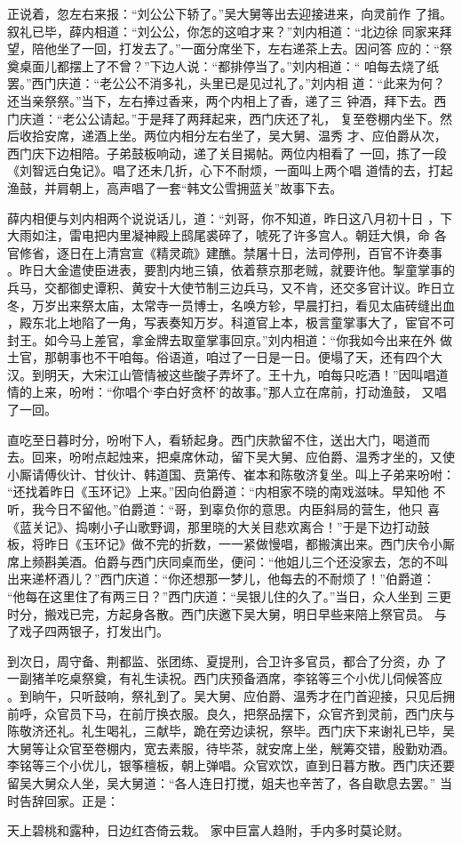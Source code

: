 正说着，忽左右来报：“刘公公下轿了。”吴大舅等出去迎接进来，向灵前作
了揖。叙礼已毕，薛内相道：“刘公公，你怎的这咱才来？”刘内相道：“北边徐
同家来拜望，陪他坐了一回，打发去了。”一面分席坐下，左右递茶上去。因问答
应的：“祭奠桌面儿都摆上了不曾？”下边人说：“都排停当了。”刘内相道：“
咱每去烧了纸罢。”西门庆道：“老公公不消多礼，头里已是见过礼了。”刘内相
道：“此来为何？还当亲祭祭。”当下，左右捧过香来，两个内相上了香，递了三
钟酒，拜下去。西门庆道：“老公公请起。”于是拜了两拜起来，西门庆还了礼，
复至卷棚内坐下。然后收拾安席，递酒上坐。两位内相分左右坐了，吴大舅、温秀
才、应伯爵从次，西门庆下边相陪。子弟鼓板响动，递了关目揭帖。两位内相看了
一回，拣了一段《刘智远白兔记》。唱了还未几折，心下不耐烦，一面叫上两个唱
道情的去，打起渔鼓，并肩朝上，高声唱了一套“韩文公雪拥蓝关”故事下去。

薛内相便与刘内相两个说说话儿，道：“刘哥，你不知道，昨日这八月初十日
，下大雨如注，雷电把内里凝神殿上鸱尾裘碎了，唬死了许多宫人。朝廷大惧，命
各官修省，逐日在上清宫宣《精灵疏》建醮。禁屠十日，法司停刑，百官不许奏事
。昨日大金遣使臣进表，要割内地三镇，依着蔡京那老贼，就要许他。掣童掌事的
兵马，交都御史谭积、黄安十大使节制三边兵马，又不肯，还交多官计议。昨日立
冬，万岁出来祭太庙，太常寺一员博士，名唤方轸，早晨打扫，看见太庙砖缝出血
，殿东北上地陷了一角，写表奏知万岁。科道官上本，极言童掌事大了，宦官不可
封王。如今马上差官，拿金牌去取童掌事回京。”刘内相道：“你我如今出来在外
做土官，那朝事也不干咱每。俗语道，咱过了一日是一日。便塌了天，还有四个大
汉。到明天，大宋江山管情被这些酸子弄坏了。王十九，咱每只吃酒！”因叫唱道
情的上来，吩咐：“你唱个‘李白好贪杯’的故事。”那人立在席前，打动渔鼓，
又唱了一回。

直吃至日暮时分，吩咐下人，看轿起身。西门庆款留不住，送出大门，喝道而
去。回来，吩咐点起烛来，把桌席休动，留下吴大舅、应伯爵、温秀才坐的，又使
小厮请傅伙计、甘伙计、韩道国、贲第传、崔本和陈敬济复坐。叫上子弟来吩咐：
“还找着昨日《玉环记》上来。”因向伯爵道：“内相家不晓的南戏滋味。早知他
不听，我今日不留他。”伯爵道：“哥，到辜负你的意思。内臣斜局的营生，他只
喜《蓝关记》、捣喇小子山歌野调，那里晓的大关目悲欢离合！”于是下边打动鼓
板，将昨日《玉环记》做不完的折数，一一紧做慢唱，都搬演出来。西门庆令小厮
席上频斟美酒。伯爵与西门庆同桌而坐，便问：“他姐儿三个还没家去，怎的不叫
出来递杯酒儿？”西门庆道：“你还想那一梦儿，他每去的不耐烦了！”伯爵道：
“他每在这里住了有两三日？”西门庆道：“吴银儿住的久了。”当日，众人坐到
三更时分，搬戏已完，方起身各散。西门庆邀下吴大舅，明日早些来陪上祭官员。
与了戏子四两银子，打发出门。

到次日，周守备、荆都监、张团练、夏提刑，合卫许多官员，都合了分资，办
了一副猪羊吃桌祭奠，有礼生读祝。西门庆预备酒席，李铭等三个小优儿伺候答应
。到晌午，只听鼓响，祭礼到了。吴大舅、应伯爵、温秀才在门首迎接，只见后拥
前呼，众官员下马，在前厅换衣服。良久，把祭品摆下，众官齐到灵前，西门庆与
陈敬济还礼。礼生喝礼，三献毕，跪在旁边读祝，祭毕。西门庆下来谢礼已毕，吴
大舅等让众官至卷棚内，宽去素服，待毕茶，就安席上坐，觥筹交错，殷勤劝酒。
李铭等三个小优儿，银筝檀板，朝上弹唱。众官欢饮，直到日暮方散。西门庆还要
留吴大舅众人坐，吴大舅道：“各人连日打搅，姐夫也辛苦了，各自歇息去罢。”
当时告辞回家。正是：

天上碧桃和露种，日边红杏倚云栽。
家中巨富人趋附，手内多时莫论财。